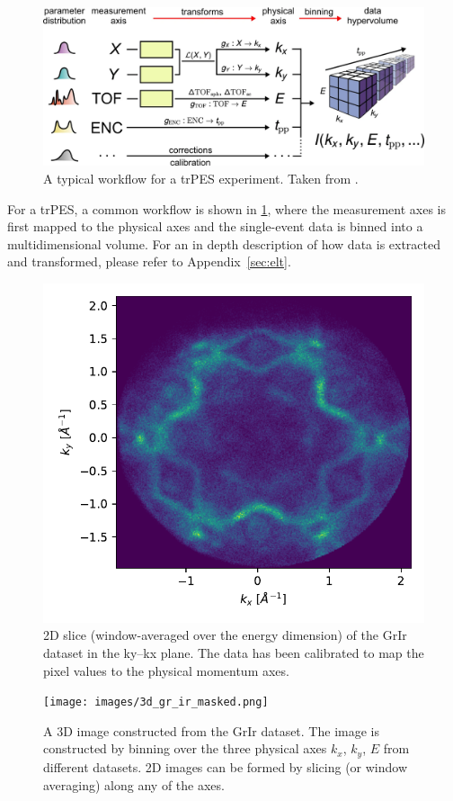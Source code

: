 \begin{figure}[h]
    \centering
    \includegraphics[width=1\linewidth]{images/41597_2020_769_Fig2_HTML.png}
    \caption{A typical workflow for a \gls{trPES} experiment. Taken from \cite{xianOpensourceEndtoendWorkflow2020}.}
    \label{fig:mpes_workflow}
\end{figure}

For a \gls{trPES}, a common workflow is shown in \cref{fig:mpes_workflow}, where the measurement axes is first mapped to the  physical axes and the single-event data is binned into a multidimensional volume. For an in depth description of how data is extracted and transformed, please refer to Appendix~\ref{sec:elt}.

\begin{figure}
    \centering
    \includegraphics[width=0.5\linewidth]{images/calibrated_momentum.pdf}
    \caption{2D slice (window-averaged over the energy dimension) of the \gls{GrIr} dataset in the \gls{ky}--\gls{kx} plane. The data has been calibrated to map the pixel values to the physical momentum axes.}
    \label{fig:grir-2d-slice-calibrated}
\end{figure}

\begin{figure}[h]
    \centering
    \texttt{[image: images/3d\_gr\_ir\_masked.png]}
    \caption{A 3D image constructed from the \gls{GrIr} dataset. The image is constructed by binning over the three physical axes $k_x$, $k_y$, $E$ from different datasets. 2D images can be formed by slicing (or window averaging) along any of the axes.}
    \label{fig:3d-gr-ir}
\end{figure}

